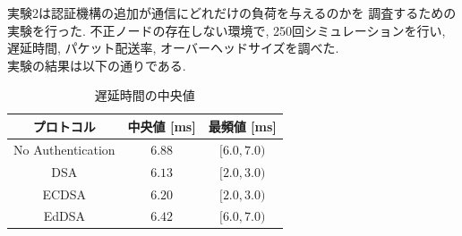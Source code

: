 実験2は認証機構の追加が通信にどれだけの負荷を与えるのかを
調査するための実験を行った. 
不正ノードの存在しない環境で, 250回シミュレーションを行い, 
遅延時間, パケット配送率, オーバーヘッドサイズを調べた. \\
\indent 実験の結果は以下の通りである. \\

\begin{longtable}{ccc}
  \caption{遅延時間の中央値}
  \label{tab:exp2_delay} \\
  \endfirsthead
  \hline
  \multicolumn{1}{c}{プロトコル} &
  \multicolumn{1}{c}{中央値 [ms]} &
  \multicolumn{1}{c}{最頻値 [ms]} \\ \hline \hline
  No Authentication & $6.88$ & $[6.0, 7.0)$ \\
  DSA & $6.13$ & $[2.0, 3.0)$ \\
  ECDSA & $6.20$ & $[2.0, 3.0)$ \\
  EdDSA & $6.42$ & $[6.0, 7.0)$ \\ \hline
\end{longtable}

